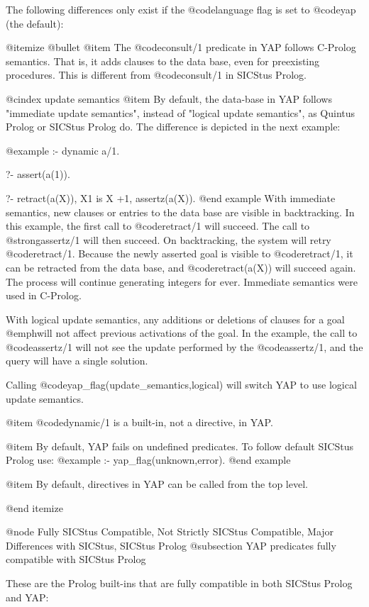 {{{{{{{{The following differences only exist if the @code{language} flag is set
to @code{yap} (the default):

@itemize @bullet
@item The @code{consult/1} predicate in YAP follows C-Prolog
semantics. That is, it adds clauses to the data base, even for
preexisting procedures. This is different from @code{consult/1} in
SICStus Prolog.

@cindex update semantics
@item By default, the data-base in YAP follows "immediate update
semantics", instead of "logical update semantics", as Quintus Prolog or
SICStus Prolog do. The difference is depicted in the next example:

@example
:- dynamic a/1.

?- assert(a(1)).

?- retract(a(X)), X1 is X +1, assertz(a(X)).
@end example
With immediate semantics, new clauses or entries to the data base are
visible in backtracking. In this example, the first call to
@code{retract/1} will succeed. The call to @strong{assertz/1} will then
succeed. On backtracking, the system will retry
@code{retract/1}. Because the newly asserted goal is visible to
@code{retract/1}, it can be retracted from the data base, and
@code{retract(a(X))} will succeed again. The process will continue
generating integers for ever. Immediate semantics were used in C-Prolog.

With logical update semantics, any additions or deletions of clauses
for a goal @emph{will not affect previous activations of the
goal}. In the example, the call to @code{assertz/1} will not see the
update performed by the @code{assertz/1}, and the query will have a
single solution.

Calling @code{yap_flag(update_semantics,logical)} will switch
YAP to use logical update semantics.

@item @code{dynamic/1} is a built-in, not a directive, in YAP.

@item By default, YAP fails on undefined predicates. To follow default
SICStus Prolog use:
@example
:- yap_flag(unknown,error).
@end example

@item By default, directives in YAP can be called from the top level.

@end itemize

@node Fully SICStus Compatible, Not Strictly SICStus Compatible, Major Differences with SICStus, SICStus Prolog
@subsection YAP predicates fully compatible with SICStus Prolog

These are the Prolog built-ins that are fully compatible in both SICStus
Prolog and YAP:

}}}}}}}}
